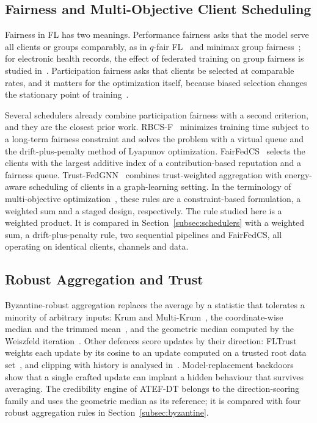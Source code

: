 \subsection{Fairness and Multi-Objective Client Scheduling}
\begin{revblock}Fairness in FL has two meanings. Performance fairness asks that the model serve all clients or groups comparably, as in $q$-fair FL~\cite{li2020fair} and minimax group fairness~\cite{papadaki2022minimax}; for electronic health records, the effect of federated training on group fairness is studied in~\cite{poulain2023improving}. Participation fairness asks that clients be selected at comparable rates, and it matters for the optimization itself, because biased selection changes the stationary point of training~\cite{cho2022towards,wang2020tackling}.

Several schedulers already combine participation fairness with a second criterion, and they are the closest prior work. RBCS-F~\cite{huang2021efficiency} minimizes training time subject to a long-term fairness constraint and solves the problem with a virtual queue and the drift-plus-penalty method of Lyapunov optimization. FairFedCS~\cite{shi2023fairfedcs} selects the clients with the largest additive index of a contribution-based reputation and a fairness queue. Trust-FedGNN~\cite{reis2026trustfedgnn} combines trust-weighted aggregation with energy-aware scheduling of clients in a graph-learning setting. In the terminology of multi-objective optimization~\cite{marler2004survey}, these rules are a constraint-based formulation, a weighted sum and a staged design, respectively. The rule studied here is a weighted product. It is compared in Section~\ref{subsec:schedulers} with a weighted sum, a drift-plus-penalty rule, two sequential pipelines and FairFedCS, all operating on identical clients, channels and data.\end{revblock}

\subsection{Robust Aggregation and Trust}
Byzantine-robust aggregation replaces the average by a statistic that tolerates a minority of arbitrary inputs: Krum and Multi-Krum~\cite{blanchard2017machine}, the coordinate-wise median and the trimmed mean~\cite{yin2018byzantine}, and the geometric median computed by the Weiszfeld iteration~\cite{pillutla2022robust}. Other defences score updates by their direction: FLTrust weights each update by its cosine to an update computed on a trusted root data set~\cite{cao2021fltrust}, and clipping with history is analysed in~\cite{karimireddy2021learning}. Model-replacement backdoors~\cite{bagdasaryan2020backdoor} show that a single crafted update can implant a hidden behaviour that survives averaging. The credibility engine of ATEF-DT belongs to the direction-scoring family and uses the geometric median as its reference; it is compared with four robust aggregation rules in Section~\ref{subsec:byzantine}.

